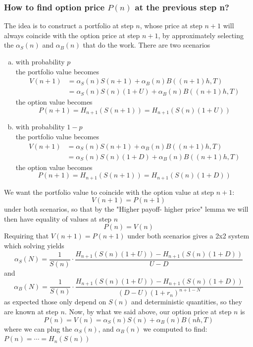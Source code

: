 \documentclass[oneside]{book}
\begin{document}
\subsubsection{How to find option price $P(n)$ at the previous step n?}
The idea is to construct a portfolio at step $n$, whose price at step $n+1$ will always
coincide with the option price at step $n+1$, by approximately selecting the $\alpha_S(n)$ and
$\alpha_B(n)$ that do the work. There are two scenarios
\begin{enumerate}[(a)]
    \item with probability $p$ \\
    the portfolio value becomes
        \begin{align*}
            V(n+1) &= \alpha_S(n) S(n+1) + \alpha_B(n) B((n+1)h, T) \\
                &= \alpha_S(n) S(n)(1+U) + \alpha_B(n) B((n+1)h, T)
        \end{align*}
        the option value becomes
        \begin{equation*}
            P(n+1) = H_{n+1}(S(n+1)) = H_{n+1}(S(n)(1+U))
        \end{equation*}
    \item with probability $1-p$ \\
    the portfolio value becomes
        \begin{align*}
            V(n+1) &= \alpha_S(n) S(n+1) + \alpha_B(n) B((n+1)h, T) \\
                &= \alpha_S(n) S(n)(1+D) + \alpha_B(n) B((n+1)h, T)
        \end{align*}
        the option value becomes
        \begin{equation*}
            P(n+1) = H_{n+1}(S(n+1)) = H_{n+1}(S(n)(1+D))
        \end{equation*}
\end{enumerate}

We want the portfolio value to coincide with the option value at step $n+1$:
$$
    V(n+1) = P(n+1)
$$
under both scenarios, so that by the "Higher payoff- higher price" lemma we will then
have equality of values at step $n$
$$P(n)=V(n)$$
Requiring that $V(n+1) = P(n+1)$ under both scenarios gives a 2x2 system which solving
yields
$$
    \alpha_S(N) = \frac{1}{S(n)} \cdot \frac{H_{n+1}(S(n)(1+U))-H_{n+1}(S(n)(1+D))}{U-D}
$$
and
$$
    \alpha_B(N) = \frac{1}{S(n)} \cdot \frac{H_{n+1}(S(n)(1+U))-H_{n+1}(S(n)(1+D))}{(D-U)(1+r_n)^{n+1-N}}
$$
as expected those only depend on $S(n)$ and deterministic quantities, so they are known at step
$n$. Now, by what we said above, our option price at step $n$ is
$$
P(n) = V(n) = \alpha_S(n)S(n) + \alpha_B(n)B(nh, T)
$$
where we can plug the $\alpha_S(n)$, and $\alpha_B(n)$ we computed to find:
$P(n) = \cdots = H_n(S(n))$
\end{document}
